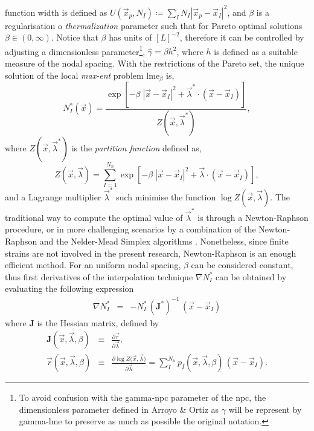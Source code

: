 \documentclass[preprint,12pt,a4paper]{elsarticle}
\newcommand{\tens}[1]{
  \ensuremath{\mathbf{{#1}}}
}
\begin{document}
function width is defined as $U(\vec{x}_p,N_I) \coloneqq
\sum_I N_I |\vec{x}_p - \vec{x}_I |^2$, and $\beta$ is a
regularisation o \textit{thermalization} parameter such that for
Pareto optimal solutions $\beta \in
(0,\infty)$. Notice that $\beta$ has units of $[L]^{-2}$,
therefore it can be controlled by adjusting a dimensionless
parameter\footnote{To avoid confusion with the \gls{gamma-npc} parameter of
  the \acrshort{npc}, the dimensionless parameter defined in Arroyo \&
  Ortiz \cite{Arroyo2006} as $\gamma$ will be represent by
  \gls{gamma-lme} to preserve as much as possible the original notation.},
$\widehat{\gamma}=\beta h^2$, where $h$ is defined as a
suitable measure of the nodal spacing. With the restrictions of the
Pareto set, the unique solution of the local
\textit{max-ent} problem \acrshort{lme}$_\beta$ is,
 \begin{equation}
  \label{eq:LME-p}
N_I^*(\vec{x})=\frac{\exp\left[ -\beta \; |\vec{x}-\vec{x}_I|^2 +
    \vec{\lambda}^* \cdot (\vec{x}-\vec{x}_I) \right] } {Z(\vec{x},\vec{\lambda}^*)},
\end{equation}
where $Z(\vec{x},\vec{\lambda}^*)$ is the \textit{partition function} defined as,
\begin{equation}
  \label{eq:LME-Z}
Z(\vec{x}, {\vec{\lambda}}) = \sum_{I=1}^{N_n}{ \exp \left[ -\beta \; |\vec{x}-\vec{x}_I|^2 + \vec{\lambda} \cdot (\vec{x}-\vec{x}_I)  \right]},
\end{equation}
and a Lagrange multiplier $\vec{\lambda}^*$ such minimise the function $\log
Z(\vec{x}, \vec{\lambda})$.
The traditional way to compute the optimal value of $\vec{\lambda}^*$
is through a Newton-Raphson procedure, or in more challenging
scenarios by a combination of the Newton-Raphson and the Nelder-Mead
Simplex algorithms \cite{Navas2018a}. Nonetheless, since finite
strains are not involved in the present research, Newton-Raphson is an
enough efficient method. For an uniform nodal spacing, $\beta$ can be
considered constant, thus first derivatives of the interpolation technique $\nabla
N^*_I$ can be obtained 
by evaluating the following expression
\begin{eqnarray}
  \label{eq:LME-gradp} 
\nabla N^*_I &=& -N^*_I \,  (\tens{J}^*)^{-1} \,  (\vec{x} - \vec{x}_I)
\end{eqnarray}
where $\tens{J}$ is the Hessian matrix, defined by
\begin{eqnarray}
  \label{eq:LME-J} 
  \tens{J}(\vec{x}, \vec{\lambda},\beta) &\equiv& \frac{\partial
                                                  \vec{r}}{\partial \vec{\lambda}},\\
  \label{eq:LME-r}
  \vec{r}(\vec{x},\vec{\lambda},\beta) &\equiv& \frac{\partial \log{ Z(   \vec{x},\vec{\lambda}})}{\partial \vec{\lambda}}  = \sum_I^{N_n} p_I(\vec{x},\vec{\lambda},\beta) \, (\vec{x} - \vec{x}_I).
\end{eqnarray}
\end{document}
